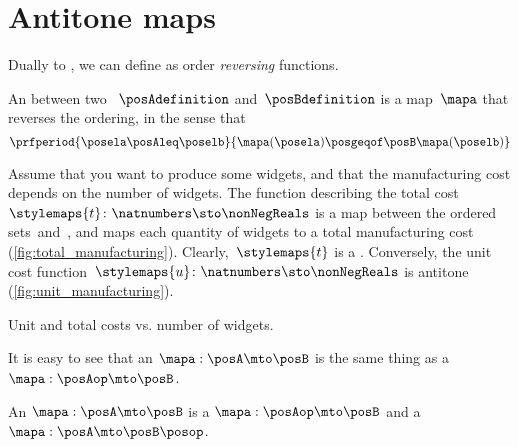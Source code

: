 \section{Antitone maps}

Dually to , we can define  as order \emph{reversing} functions.

\begin{definition}
    \label{def:antitone}
    An  between two ~$\posAdefinition$ and~$\posBdefinition$ is a map~$\mapa$ that reverses the ordering, in the sense that
    \begin{equation}
        \prfperiod{
            \posela \posAleq \poselb
        }{
            \mapa(\posela) \posgeqof\posB \mapa(\poselb)
        }
    \end{equation}
\end{definition}

\begin{example}
    Assume that you want to produce some widgets, and that the manufacturing cost depends on the number of widgets.
    The function describing the total cost~$\stylemaps{t}\colon \natnumbers \sto \nonNegReals$ is a map between the ordered sets~\natnumbers and~\nonNegReals, and maps each quantity of widgets to a total manufacturing cost (\cref{fig:total_manufacturing}).
    Clearly,~$\stylemaps{t}$ is a .
    Conversely, the unit cost function~$\stylemaps{u}\colon \natnumbers \sto \nonNegReals$ is antitone (\cref{fig:unit_manufacturing}).
\end{example}

\begin{marginfigure}

    \caption{Unit and total costs vs. number of widgets.}
\end{marginfigure}

It is easy to see that an  $\mapa: \posA \mto \posB$ is the same thing as a  $\mapa: \posAop \mto \posB$.

\begin{lemma}\label{lem:antitone-is-monotone}
    An  $\mapa: \posA \mto \posB$ is a  $\mapa: \posAop \mto \posB$
    and a  $\mapa: \posA \mto \posB\posop$.
\end{lemma}
